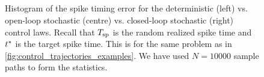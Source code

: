 \begin{figure}[h]   
\begin{center} 
\\ 
  \\ 
\\ 
\\ 
  \caption[labelInTOC]{Histogram of the spike timing error for the 
  deterministic (left) vs. open-loop stochastic (centre) vs. closed-loop 
  stochastic (right) control laws. 
  Recall that ${ T_{\textrm{sp} } }$ is the random realized spike time and ${ t^* }$ is the target 
  spike time.   
  This is for the same problem as in 
  \cref{fig:control_trajectories_examples}. 
  We have used $N=10000$ sample paths 
  to form the statistics.} 
  \label{fig:error_histograms_det_vs_openloop_vs_stoch} 
\end{center} 
\end{figure} 
